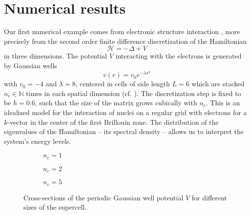 \documentclass[12pt]{article}
\begin{document}
\section{Numerical results}
\label{sec:results}

Our first numerical example comes from electronic structure interaction \cite{lin-2017-randomized-estimation}, more precisely from the second order finite difference discretization of the Hamiltonian
\begin{equation}
    \mathcal{H} = - \Delta + V
    \label{equ:5-experiments-electronic-hamiltonian}
\end{equation}
in three dimensions. The potential $V$ interacting with the electrons is generated by Gaussian wells
\begin{equation}
    v(r) = v_0 e^{-\lambda r^2}
    \label{equ:5-experiments-gaussian-cell}
\end{equation}
with $v_0 = -4$ and $\lambda = 8$, centered in cells of side length $L=6$ which are stacked $n_c \in \mathbb{N}$ times in each spatial dimension (cf. ). The discretization step is fixed to be $h=0.6$, such that the size of the matrix grows cubically with $n_c$. This is an idealized model for the interaction of nuclei on a regular grid with electrons for a $k$-vector in the center of the first Brillouin zone. The distribution of the eigenvalues of the Hamiltonian -- its spectral density -- allows us to interpret the system's energy levels.

\begin{figure}[ht]
    \begin{subfigure}[b]{0.32\columnwidth}
        
        \caption{$n_c=1$}
        \label{fig:gaussian-well-1}
    \end{subfigure}
    \begin{subfigure}[b]{0.32\columnwidth}
        
        \caption{$n_c=2$}
        \label{fig:gaussian-well-2}
    \end{subfigure}
    \begin{subfigure}[b]{0.32\columnwidth}
        
        \caption{$n_c=5$}
        \label{fig:gaussian-well-5}
    \end{subfigure}
    \caption{Cross-sections of the periodic Gaussian well potential $V$ for different sizes of the supercell.}
    \label{fig:gaussian-well}
\end{figure}

\end{document}
